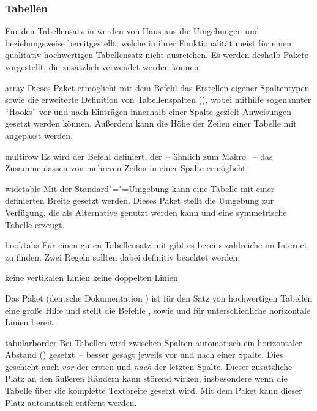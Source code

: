 \subsubsection{Tabellen}
%
Für den Tabellensatz in  werden von Haus aus die Umgebungen 
 und  beziehungsweise 
 bereitgestellt, welche in ihrer Funktionalität meist 
für einen qualitativ hochwertigen Tabellensatz nicht ausreichen. Es werden 
deshalb Pakete vorgestellt, die zusätzlich verwendet werden können. 
\begin{packages}
\item[array]
  Dieses Paket ermöglicht mit dem Befehl  das Erstellen 
  eigener Spaltentypen sowie die erweiterte Definition von Tabellenspalten
  (\PValue{>\PParameter{\dots}}\PValue{<\PParameter{\dots}}), 
  wobei mithilfe sogenannter \enquote{Hooks} vor und nach Einträgen innerhalb 
  einer Spalte gezielt Anweisungen gesetzt werden können. Außerdem kann die 
  Höhe der Zeilen einer Tabelle mit  angepasst werden.  
\item[multirow]
  Es wird der Befehl  definiert, der~-- ähnlich zum Makro 
  ~-- das Zusammenfassen von mehreren Zeilen in einer 
  Spalte ermöglicht.
\item[widetable]
  Mit der Standard"="=Umgebung  kann eine 
  Tabelle mit einer definierten Breite gesetzt werden. Dieses Paket stellt die 
  Umgebung  zur Verfügung, die als Alternative genutzt 
  werden kann und eine symmetrische Tabelle erzeugt.
\item[booktabs]
  Für einen guten Tabellensatz mit  gibt es bereits zahlreiche 
   im 
  Internet zu finden. Zwei Regeln sollten dabei definitiv beachtet werden:
  \begin{enumerate}[itemindent=0pt,labelwidth=*,labelsep=1em,label=\Roman*.]
  \stditem keine vertikalen Linien
  \stditem keine doppelten Linien
  \end{enumerate}
  Das Paket  (deutsche Dokumentation ) 
  ist für den Satz von hochwertigen Tabellen eine große Hilfe und stellt die 
  Befehle ,  sowie  und 
   für unterschiedliche horizontale Linien bereit.
\item[tabularborder]
  Bei Tabellen wird zwischen Spalten automatisch ein horizontaler Abstand 
  () gesetzt~-- besser gesagt jeweils vor und nach einer 
  Spalte. Dies geschieht auch \emph{vor} der ersten und \emph{nach} der letzten 
  Spalte. Dieser zusätzliche Platz an den äußeren Rändern kann störend wirken, 
  insbesondere wenn die Tabelle über die komplette Textbreite gesetzt wird. Mit 
  dem Paket  kann dieser Platz automatisch entfernt 
  werden.
  

\end{packages}
